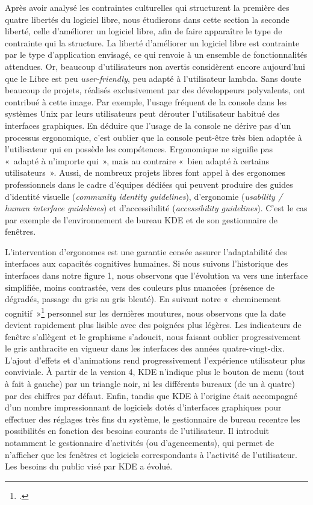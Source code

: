 \documentclass{FramateX}
\begin{document}
\begin{refsection}
Après avoir analysé les contraintes culturelles qui structurent la
première des quatre libertés du logiciel libre, nous étudierons dans
cette section la seconde liberté, celle d'améliorer un logiciel libre,
afin de faire apparaître le type de contrainte qui la structure. La
liberté d'améliorer un logiciel libre est contrainte par le type
d'application envisagé, ce qui renvoie à un ensemble de fonctionnalités
attendues. Or, beaucoup d'utilisateurs non avertis considèrent encore
aujourd'hui que le Libre est peu \textit{user-friendly}, peu adapté à
l'utilisateur lambda. Sans doute beaucoup de projets, réalisés
exclusivement par des développeurs polyvalents, ont contribué à cette
image. Par exemple, l'usage fréquent de la console dans les systèmes
Unix par leurs utilisateurs peut dérouter l'utilisateur habitué des
interfaces graphiques. En déduire que l'usage de la console ne dérive
pas d'un processus ergonomique, c'est oublier que la console peut-être
très bien adaptée à l'utilisateur qui en possède les compétences.
Ergonomique ne signifie pas «~adapté à n'importe qui~», mais au
contraire «~bien adapté à certains utilisateurs~». Aussi, de nombreux
projets libres font appel à des ergonomes professionnels dans le cadre
d'équipes dédiées qui peuvent produire des guides d'identité visuelle
(\textit{community identity guidelines}), d'ergonomie (\textit{usability /
human interface guidelines}) et d'accessibilité
(\textit{accessibility guidelines}). C'est le cas par exemple de
l'environnement de bureau KDE et de son gestionnaire de fenêtres.

L'intervention d'ergonomes est une garantie censée assurer
l'adaptabilité des interfaces aux capacités cognitives humaines. Si
nous suivons l'historique des interfaces dans notre figure 1, nous
observons que l'évolution va vers une interface simplifiée, moins
contrastée, vers des couleurs plus nuancées (présence de dégradés,
passage du gris au gris bleuté). En suivant notre «~cheminement
cognitif~»\footnote{\cite{whartoncognitive1994}.} personnel sur les dernières
moutures, nous observons que la date devient rapidement plus lisible
avec des poignées plus légères. Les indicateurs de fenêtre s'allègent
et le graphisme s'adoucit, nous faisant oublier progressivement le gris
anthracite en vigueur dans les interfaces des années quatre-vingt-dix.
L'ajout d'effets et d'animations rend progressivement l'expérience
utilisateur plus conviviale. À partir de la version 4, KDE n'indique
plus le bouton de menu (tout à fait à gauche) par un triangle noir, ni
les différents bureaux (de un à quatre) par des chiffres par défaut.
Enfin, tandis que KDE à l'origine était accompagné d'un nombre
impressionnant de logiciels dotés d'interfaces graphiques pour
effectuer des réglages très fins du système, le gestionnaire de bureau
recentre les possibilités en fonction des besoins courants de
l'utilisateur. Il introduit notamment le gestionnaire d'activités (ou
d'agencements), qui permet de n'afficher que les fenêtres et logiciels
correspondants à l'activité de l'utilisateur. Les besoins du public
visé par KDE a évolué. 


\end{refsection}
\end{document}
